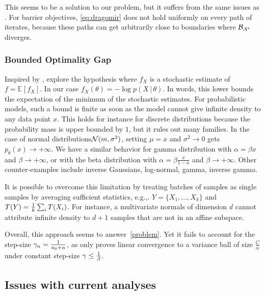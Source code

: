 \documentclass[twoside]{article}
\newcommand*{\expect}[2][]{\ensuremath{\mathbb{E}_{#1} \left[ #2 \right] }} %
\newcommand*{\expecti}[2][]{\ensuremath{\mathbb{E}_{#1} [ #2 ] }} %
\newcommand{\cond}{\,\vert\,}
\newcommand{\logpart}{A}
\newcommand{\bregmanconj}{\cB_{\logpart^*}}
\newcommand{\nat}{\theta}
\newcommand{\lr}{\gamma} %
\newcommand{\stgcvx}{\alpha} %
\newcommand{\smooth}{\beta} %
\begin{document}
This seems to be a solution to our problem, but it suffers from the same issues as \citet{hanzely2018fastest}. 
For barrier objectives, \cref{eq:dragomir} does not hold uniformly on every path of iterates, 
because these paths can get arbitrarily close to boundaries where $\bregmanconj$ diverges.

\subsubsection{Bounded Optimality Gap}
Inspired by \citet{loizou2021stochastic}, \citet{dorazio2021stochastic} explore the hypothesis
\alignn{
\min_\nat f(\nat) - \expect[X]{\min_\nat f_X(\nat)} \leq C,
\label{eq:dorazio}
}
where $f_X$ is a stochastic estimate of $f = \expecti{f_X}$. In our case $f_X(\nat) = - \log p(X\cond \nat)$.
In words, this lower bounds the expectation of the minimum of the stochastic estimates.
For probabilistic models, such a bound is finite as soon as the model cannot give infinite density to any data point $x$.
This holds for instance for discrete distributions because the probability mass is upper bounded by $1$,
but it rules out  many families.
In the case of normal distributions${\mathcal N}(m, \sigma^2)$, setting $\mu=x$ and $\sigma^2 \rightarrow 0$ gets $p_\nat (x) \rightarrow +\infty$. We have a similar behavior for gamma distribution with $\alpha = \beta x$ and $\beta \rightarrow +\infty$, or with the beta distribution with $\alpha=\beta \frac{x}{1-x}$ and $\beta \rightarrow +\infty$.
 Other counter-examples include inverse Gaussians, log-normal, gamma, inverse gamma.

It is possible to overcome this limitation by treating batches of samples as single samples by averaging sufficient statistics, e.g.,. $Y = \{X_1, \dots, X_k\}$ and $T(Y) = \frac{1}{k}\sum_i T(X_i)$.
For instance, a multivariate normals of dimension $d$ cannot attribute infinite density to $d+1$ samples that are not in an affine subspace.

Overall, this approach seems to answer~\eqref{problem}. Yet it fails to account for the step-size $\lr_n = \inv{n_0+n}$, as \citet[Thm.1]{dorazio2021stochastic} only proves linear convergence to a variance ball of size $\frac{C}{\stgcvx}$ under constant step-size $\lr \leq \inv{\smooth}$.

\subsection{Issues with current analyses}
\end{document}

